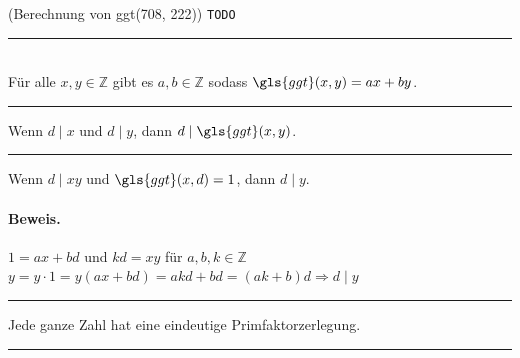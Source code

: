 \documentclass[9pt]{article}
\begin{document}
\begin{bsp}
(Berechnung von \gls{ggt}(708, 222)) \texttt{TODO}
\end{bsp} \noindent \rule{8cm}{0.4pt}

\begin{satz} \label{satz8-2} \\
Für alle $x,y \in \mathbb{Z}$ gibt es $a,b \in \mathbb{Z}$ sodass $\gls{ggt}(x,y) = ax + by$.
 \end{satz} \noindent \rule{8cm}{0.4pt}
\begin{folg}
Wenn $d\mid x$ und $d\mid y$, dann $d\mid \gls{ggt}(x,y)$. \\
\end{folg} \noindent \rule{8cm}{0.4pt}
\begin{folg}
Wenn $d\mid xy$ und $\gls{ggt}(x,d) = 1$, dann $d\mid y$. \\
\paragraph{Beweis.} 
$1 = ax + bd$ und $kd = xy$ für $a,b,k \in \mathbb{Z}$ \\
$y=y \cdot 1 = y(ax +bd) = akd +bd = (ak +b)d \Rightarrow d\mid y$
\end{folg} \noindent \rule{8cm}{0.4pt}
\begin{folg}
Jede ganze Zahl hat eine eindeutige Primfaktorzerlegung. 
\end{folg} \noindent \rule{8cm}{0.4pt}
\end{document}
